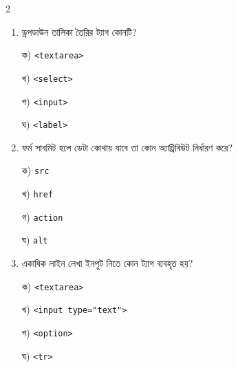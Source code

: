 \begin{multicols}{2}
\begin{enumerate}[leftmargin=*,itemsep=5pt]
\item \begin{minipage}[t]{\linewidth}\vspace{0pt}
ড্রপডাউন তালিকা তৈরির ট্যাগ কোনটি?
\par ক) \texttt{<textarea>}
\par খ) \texttt{<select>}
\par গ) \texttt{<input>}
\par ঘ) \texttt{<label>}
\end{minipage}

\item \begin{minipage}[t]{\linewidth}\vspace{0pt}
ফর্ম সাবমিট হলে ডেটা কোথায় যাবে তা কোন অ্যাট্রিবিউট নির্ধারণ করে?
\par ক) \texttt{src}
\par খ) \texttt{href}
\par গ) \texttt{action}
\par ঘ) \texttt{alt}
\end{minipage}

\item \begin{minipage}[t]{\linewidth}\vspace{0pt}
একাধিক লাইন লেখা ইনপুট নিতে কোন ট্যাগ ব্যবহৃত হয়?
\par ক) \texttt{<textarea>}
\par খ) \texttt{<input type="text">}
\par গ) \texttt{<option>}
\par ঘ) \texttt{<tr>}
\end{minipage}
\end{enumerate}
\end{multicols}

